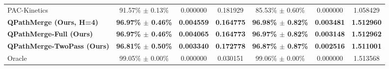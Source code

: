 \begin{table}[t]
\begin{center}
\begin{small}
\begin{sc}
\begin{tabular}{lcccccc}
PAC-Kinetics      & 91.57\% $\pm$ 0.13\% & 0.000000 & 0.181929 & 85.53\% $\pm$ 0.60\% & 0.000000 & 1.058429 \\
\textbf{QPathMerge (Ours, H=4)} & \textbf{96.97\% $\pm$ 0.46\%} & \textbf{0.004559} & \textbf{0.164775} & \textbf{96.98\% $\pm$ 0.82\%} & \textbf{0.003481} & \textbf{1.512960} \\
\textbf{QPathMerge-Full (Ours)} & \textbf{96.97\% $\pm$ 0.46\%} & \textbf{0.004065} & \textbf{0.164773} & \textbf{96.97\% $\pm$ 0.82\%} & \textbf{0.003148} & \textbf{1.512962} \\
\textbf{QPathMerge-TwoPass (Ours)} & \textbf{96.81\% $\pm$ 0.50\%} & \textbf{0.003340} & \textbf{0.172778} & \textbf{96.87\% $\pm$ 0.87\%} & \textbf{0.002516} & \textbf{1.511001} \\
\midrule
Oracle            & 99.05\% $\pm$ 0.00\% & 0.000000 & 0.030151 & 99.06\% $\pm$ 0.00\% & 0.000000 & 1.513568 \\
\bottomrule
\end{tabular}
\end{sc}
\end{small}
\end{center}
\vskip -0.1in
\end{table}

